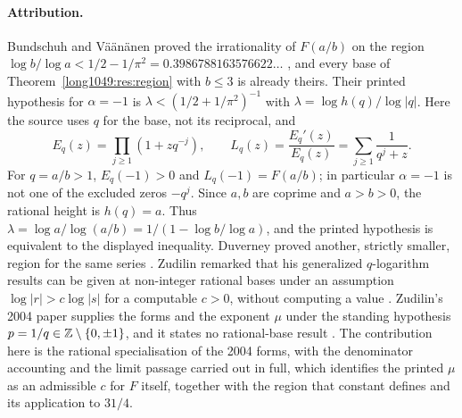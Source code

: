 \documentclass[11pt]{article}
\begin{document}
\paragraph{Attribution.}
Bundschuh and V\"a\"an\"anen proved the irrationality of $F(a/b)$ on the
region $\log b/\log a<1/2-1/\pi^{2}=0.3986788163576622\ldots$
\cite[Thm.~2, p.~177; hypotheses pp.~175--176]{bv1994}, and every base of
Theorem~\ref{long1049:res:region} with $b\le3$ is already theirs.  Their printed
hypothesis for $\alpha=-1$ is $\lambda<(1/2+1/\pi^{2})^{-1}$ with
$\lambda=\log h(q)/\log|q|$. Here the source uses $q$ for the base,
not its reciprocal, and
\[
 E_q(z)=\prod_{j\ge1}(1+zq^{-j}),\qquad
 L_q(z)=\frac{E_q'(z)}{E_q(z)}=\sum_{j\ge1}\frac1{q^j+z}.
\]
For $q=a/b>1$, $E_q(-1)>0$ and $L_q(-1)=F(a/b)$; in particular
$\alpha=-1$ is not one of the excluded zeros $-q^j$.
Since $a,b$ are coprime and $a>b>0$, the rational height is $h(q)=a$.
Thus $\lambda=\log a/\log(a/b)=1/(1-\log b/\log a)$, and the
printed hypothesis is equivalent to the displayed inequality.
Duverney proved another, strictly smaller, region for the same series
\cite[Th\'eor\`eme~2, p.~174]{duverney1996}.  Zudilin remarked that his
generalized $q$-logarithm results can be given at non-integer rational bases
under an assumption $\log|r|>c\log|s|$ for a computable $c>0$, without computing
a value \cite[Sec.~2, p.~4]{zudilin2016}.  Zudilin's 2004 paper supplies the forms and the exponent
$\mu$ under the standing hypothesis $p=1/q\in\mathbb{Z}\mathbin{\backslash}\{0,\pm1\}$, and it
states no rational-base result \cite[Sec.~2, p.~154; Thm.~1]{zudilin2004}.  The
contribution here is the rational specialisation of the 2004 forms, with the
denominator accounting and the limit passage carried out in full, which
identifies the printed $\mu$ as an admissible $c$ for $F$ itself, together with
the region that constant defines and its application to $31/4$.
\end{document}
